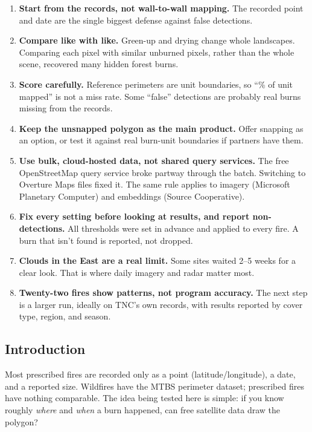 \documentclass[
]{article}
\providecommand{\tightlist}{%
  \setlength{\itemsep}{0pt}\setlength{\parskip}{0pt}}
\begin{document}
\begin{enumerate}
\def\labelenumi{\arabic{enumi}.}
\tightlist
\item
  \textbf{Start from the records, not wall-to-wall mapping.} The
  recorded point and date are the single biggest defense against false
  detections.
\item
  \textbf{Compare like with like.} Green-up and drying change whole
  landscapes. Comparing each pixel with similar unburned pixels, rather
  than the whole scene, recovered many hidden forest burns.
\item
  \textbf{Score carefully.} Reference perimeters are unit boundaries, so
  ``\% of unit mapped'' is not a miss rate. Some ``false'' detections
  are probably real burns missing from the records.
\item
  \textbf{Keep the unsnapped polygon as the main product.} Offer
  snapping as an option, or test it against real burn-unit boundaries if
  partners have them.
\item
  \textbf{Use bulk, cloud-hosted data, not shared query services.} The
  free OpenStreetMap query service broke partway through the batch.
  Switching to Overture Maps files fixed it. The same rule applies to
  imagery (Microsoft Planetary Computer) and embeddings (Source
  Cooperative).
\item
  \textbf{Fix every setting before looking at results, and report
  non-detections.} All thresholds were set in advance and applied to
  every fire. A burn that isn't found is reported, not dropped.
\item
  \textbf{Clouds in the East are a real limit.} Some sites waited 2--5
  weeks for a clear look. That is where daily imagery and radar matter
  most.
\item
  \textbf{Twenty-two fires show patterns, not program accuracy.} The
  next step is a larger run, ideally on TNC's own records, with results
  reported by cover type, region, and season.
\end{enumerate}

\subsection{Introduction}\label{introduction}

Most prescribed fires are recorded only as a point (latitude/longitude),
a date, and a reported size. Wildfires have the MTBS perimeter dataset;
prescribed fires have nothing comparable. The idea being tested here is
simple: if you know roughly \emph{where} and \emph{when} a burn
happened, can free satellite data draw the polygon?
\end{document}
